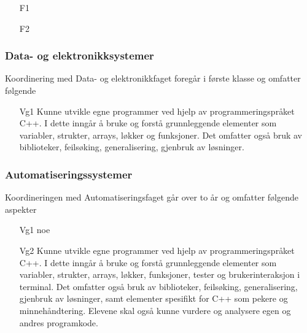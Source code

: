 		\begin{itemize}

			\item[F1]
			\item[F2]

		\end{itemize}

	\subsubsection*{Data- og elektronikksystemer}

	Koordinering med Data- og elektronikkfaget foregår i første klasse og omfatter følgende

		\begin{itemize}

			\item[Vg1] Kunne utvikle egne programmer ved hjelp av programmeringspråket C++. I dette inngår å bruke og forstå grunnleggende elementer som variabler, strukter, arrays, løkker og funksjoner. Det omfatter også bruk av biblioteker, feilsøking, generalisering, gjenbruk av løsninger.

		\end{itemize}


	\subsubsection*{Automatiseringssystemer}


		Koordineringen med Automatiseringsfaget går over to år og omfatter følgende aspekter


		\begin{itemize}

			\item[Vg1] noe

			\item[Vg2] Kunne utvikle egne programmer ved hjelp av programmeringspråket C++. I dette inngår å bruke og forstå grunnleggende elementer som variabler, strukter, arrays, løkker, funksjoner, tester og brukerinteraksjon i terminal. Det omfatter også bruk av biblioteker, feilsøking, generalisering, gjenbruk av løsninger, samt elementer spesifikt for C++ som pekere og minnehåndtering. Elevene skal også kunne vurdere og analysere egen og andres programkode.

		\end{itemize}
